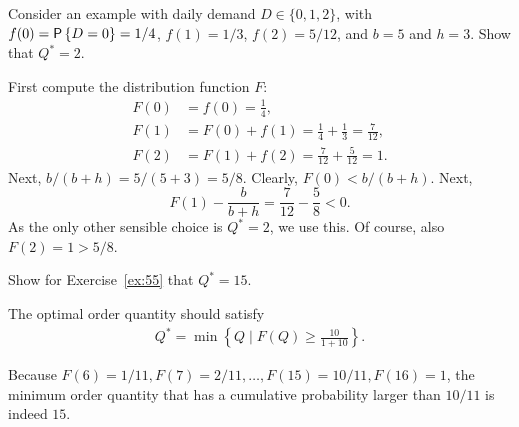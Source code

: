 \begin{exercise}
  Consider an example with daily demand $D\in \{0,1,2\}$, with 
 $f(0) = \P{D=0}=1/4$, $f(1)=1/3$, $f(2)=5/12$, and $b=5$ and $h=3$. Show that $Q^*=2$.
\begin{solution}
First compute the distribution function $F$:
\begin{align*}
  F(0) &= f(0) = \frac 1 4,\\
  F(1) &= F(0) +f(1)= \frac 1 4 + \frac 1 3 = \frac{7}{12},\\
  F(2) &= F(1) + f(2) = \frac 7{12}  + \frac 5 {12}  = 1.
\end{align*}
Next, $b/(b+h)=5/(5+3)=5/8$. Clearly, $F(0) < b/(b+h)$. Next, 
\begin{equation*}
  F(1) - \frac b{b+h} = \frac 7 {12} - \frac 5 8 < 0.
\end{equation*}
As the only other sensible choice is $Q^*=2$, we use this. Of course, also $F(2)=1>5/8$. 
\end{solution}
\end{exercise}

\begin{exercise} Show for  Exercise~\ref{ex:55} that $Q^*=15$.

\begin{solution}
 The optimal order quantity should satisfy 
\begin{align*}
Q^* = \min\left\{Q\mid F(Q)\geq \frac{10}{1+10}\right\}.
\end{align*}

Because $F(6)=1/11, F(7)=2/11, \ldots, F(15)=10/11, F(16)=1$, the minimum order quantity that has a cumulative probability larger than $10/11$ is indeed $15$. 
\end{solution}
  
\end{exercise}

